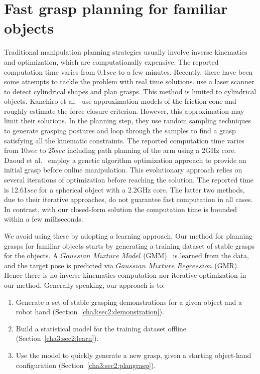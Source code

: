 \section{Fast grasp planning for familiar objects}
\label{cha3:sec2}

Traditional manipulation planning strategies usually involve inverse kinematics and optimization, which are computationally expensive. The reported computation time varies from 0.1$sec$ to a few minutes. Recently, there have been some attempts to tackle the problem with real time solutions. \citet{Richtsfeld2008} use a laser scanner to detect cylindrical shapes and plan grasps. This method is limited to cylindrical objects. Kanehiro et al.~\citep{harada2008fast} use approximation models of the friction cone and roughly estimate the force closure criterion. However, this approximation may limit their solutions. In the planning step, they use random sampling techniques to generate grasping postures and loop through the samples to find a grasp satisfying all the kinematic constraints. The reported computation time varies from 10$sec$ to 25$sec$ including path planning of the arm using a 2GHz core.
Daoud et al.~\citep{daoud2011fast} employ a genetic algorithm optimization approach to provide an initial grasp before online manipulation. This evolutionary approach relies on several iterations of optimization before reaching the solution. The reported time is 12.61$sec$ for a spherical object with a 2.2GHz core. The latter two methods, due to their iterative approaches, do not guarantee fast computation in all cases. In contrast, with our closed-form solution the computation time is bounded within a few milliseconds.

We avoid using these by adopting a learning approach.
Our method for planning grasps for familiar objects starts by generating a training dataset of stable grasps for the objects. A $Gaussian$ $Mixture$ $Model$ (GMM)~\citep{cohn1996active} is learned from the data, and the target pose is predicted via $Gaussian$ $Mixture$ $Regression$ (GMR). Hence there is no inverse kinematics computation nor iterative optimization in our method. Generally speaking, our approach is to:
\begin{enumerate}
\item Generate a set of stable grasping demonstrations for a given object and a robot hand (Section~\ref{cha3:sec2:demonstration}).
\item Build a statistical model for the training dataset offline (Section~\ref{cha3:sec2:learn}).
\item Use the model to quickly generate a new grasp, given a starting object-hand configuration (Section~\ref{cha3:sec2:plangrasp}).
\end{enumerate}


